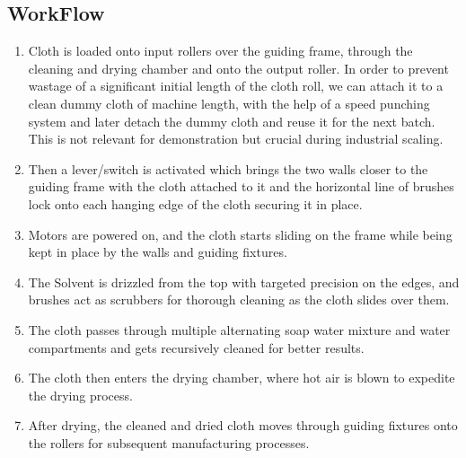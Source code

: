 \documentclass[table,french,english]{rapportCS}
\begin{document}
\subsection{WorkFlow}
\begin{enumerate}[label=$\bullet$]

    \item Cloth is loaded onto input rollers over the guiding frame, through the cleaning and drying chamber and onto the output roller. In order to prevent wastage of a significant initial length of the cloth roll, we can attach it to a clean dummy cloth of machine length, with the help of a speed punching system and later detach the dummy cloth and reuse it for the next batch. This is not relevant for demonstration but crucial during industrial scaling.

    \item Then a lever/switch is activated which brings the two walls closer to the guiding frame with the cloth attached to it and the horizontal line of brushes lock onto each hanging edge of the cloth securing it in place.

    \item Motors are powered on, and the cloth starts sliding on the frame while being kept in place by the walls and guiding fixtures.

    \item The Solvent is drizzled from the top with targeted precision on the edges, and brushes act as scrubbers for thorough cleaning as the cloth slides over them.

    \item The cloth passes through multiple alternating soap water mixture and water compartments and gets recursively cleaned for better results.

    \item The cloth then enters the drying chamber, where hot air is blown to expedite the drying process.

    \item After drying, the cleaned and dried cloth moves through guiding fixtures onto the rollers for subsequent manufacturing processes.

\end{enumerate}
\end{document}
